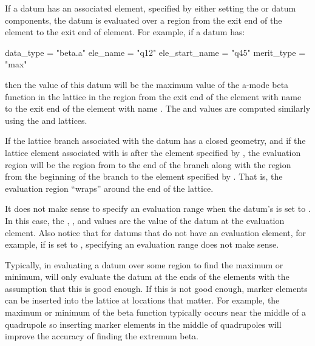 If a datum has an associated  element, specified by either setting the 
or  datum components, the datum is evaluated over a region from the exit end of the
 element to the exit end of  element. For example, if a datum has:
\begin{example}
  data_type      = "beta.a"
  ele_name       = "q12"
  ele_start_name = "q45"
  merit_type     = "max"
\end{example}
then the  value of this datum will be the maximum value of the a-mode beta function in the
 lattice in the region from the exit end of the element with name  to the exit end
of the element with name . The  and  values are computed similarly using
the  and  lattices. 

If the lattice branch associated with the datum has a closed geometry, and if the lattice element
associated with  is after the element specified by , the evaluation
region will be the region from  to the end of the branch along with the region
from the beginning of the branch to the element specified by . That is, the evaluation
region ``wraps'' around the end of the lattice.  

It does not make sense to specify an evaluation range when the datum's  is set to
. In this case, the , , and  values are the value of the
datum at the evaluation element. Also notice that for datums that do not have an evaluation element,
for example, if  is set to , specifying an evaluation range does not make
sense.

Typically, in evaluating a datum over some region to find the maximum or minimum, \tao will only
evaluate the datum at the ends of the elements with the assumption that this is good enough. If this
is not good enough, marker elements can be inserted into the lattice at locations that matter. For
example, the maximum or minimum of the beta function typically occurs near the middle of a
quadrupole so inserting marker elements in the middle of quadrupoles will improve the accuracy of
finding the extremum beta.

